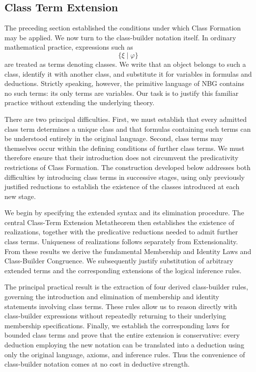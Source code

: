 \setcounter{FileDepth}{3}
\setcounter{SideTOCDepth}{3}


\subsection{Class Term Extension}

The preceding section established the conditions under which
Class Formation may be applied. We now turn to the class-builder
notation itself. In ordinary mathematical practice, expressions
such as
\[
\{\xi\mid\varphi\}
\]
are treated as terms denoting classes. We write that an object
belongs to such a class, identify it with another class, and
substitute it for variables in formulas and deductions. Strictly
speaking, however, the primitive language of NBG contains no
such terms: its only terms are variables. Our task is to justify
this familiar practice without extending the underlying theory.

There are two principal difficulties. First, we must establish
that every admitted class term determines a unique class and
that formulas containing such terms can be understood entirely
in the original language. Second, class terms may themselves
occur within the defining conditions of further class terms.
We must therefore ensure that their introduction does not
circumvent the predicativity restrictions of Class Formation.
The construction developed below addresses both difficulties
by introducing class terms in successive stages, using only
previously justified reductions to establish the existence
of the classes introduced at each new stage.

We begin by specifying the extended syntax and its elimination
procedure. The central Class-Term Extension Metatheorem then
establishes the existence of realizations, together with the
predicative reductions needed to admit further class terms.
Uniqueness of realizations follows separately from Extensionality.
From these results we derive the fundamental Membership and
Identity Laws and Class-Builder Congruence. We subsequently justify substitution of arbitrary
extended terms and the corresponding extensions of the
logical inference rules.

The principal practical result is the extraction of four
derived class-builder rules, governing the introduction and
elimination of membership and identity statements involving
class terms. These rules allow us to reason directly with
class-builder expressions without repeatedly returning to
their underlying membership specifications. Finally, we
establish the corresponding laws for bounded class terms
and prove that the entire extension is conservative: every
deduction employing the new notation can be translated into
a deduction using only the original language, axioms, and
inference rules. Thus the convenience of class-builder
notation comes at no cost in deductive strength.

